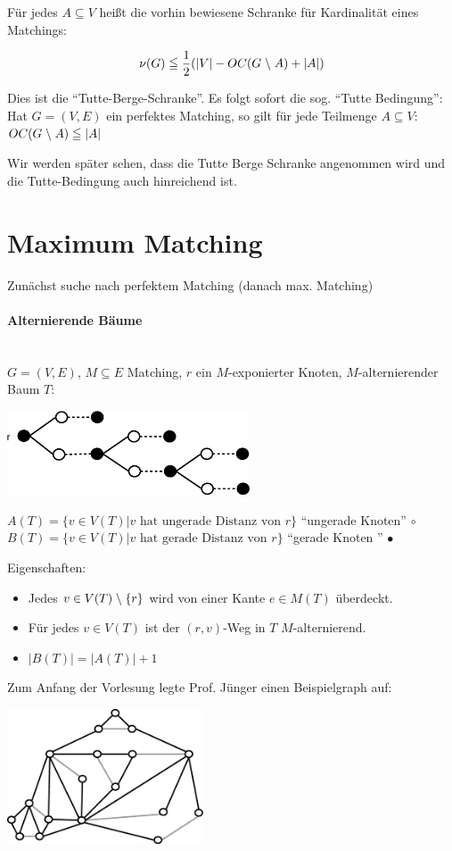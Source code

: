 Für jedes $A\subseteq V$ heißt die vorhin bewiesene Schranke für
Kardinalität eines Matchings:

\[\nu(G) \leqq \frac{1}{2}(|V| - OC(G\;\backslash\; A) + |A|)\]

Dies ist die "`Tutte-Berge-Schranke"'. Es folgt sofort die sog. "`Tutte
Bedingung"':\\
Hat $G=(V,E)$ ein perfektes Matching, so gilt für jede Teilmenge $A
\subseteq V$: $OC(G\;\backslash\; A) \leqq |A|$

Wir werden später sehen, dass die Tutte Berge Schranke angenommen wird und
die Tutte-Bedingung auch hinreichend ist.

\section{Maximum Matching}
Zunächst suche nach perfektem Matching (danach max. Matching)

\paragraph{Alternierende Bäume} \mbox{}\\
$G = (V,E)$, $M \subseteq E$ Matching, $r$ ein $M$-exponierter Knoten,
$M$-alternierender Baum $T$:

\includegraphics[height=2.5cm]{bilder/5-2altBaum}

$A(T)=\{v \in V(T)| v \mbox{ hat ungerade Distanz von }r\}$ "`ungerade
Knoten"' $\circ$\\
$B(T)=\{v \in V(T)| v \mbox{ hat gerade Distanz von }r\}$ "`gerade Knoten
"' $\bullet$

Eigenschaften:
\begin{itemize}
\item Jedes $v \in V(T) \;\backslash\; \{r\}$ wird von einer Kante $e \in M(T)$
überdeckt.
\item Für jedes $v\in V(T)$ ist der $(r,v)$-Weg in $T$ $M$-alternierend.
\item $|B(T)| = |A(T)| +1$
\end{itemize}

Zum Anfang der Vorlesung legte Prof. Jünger einen Beispielgraph auf:

\includegraphics[height=4cm]{bilder/5-2altBaum2}

